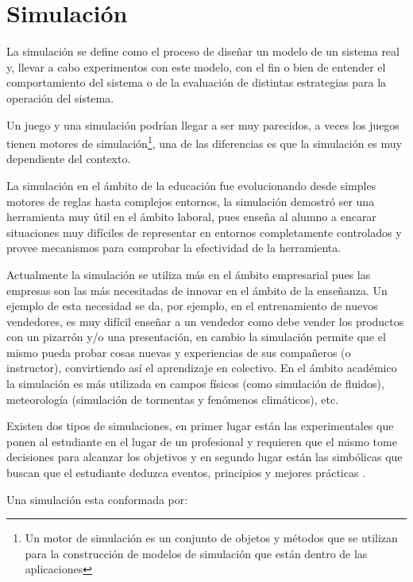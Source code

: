 \section{Simulación}
\label{sec:tics_SIMULACION}

La simulación se define como el proceso de diseñar un modelo de un sistema real
y, llevar a cabo experimentos con este modelo, con el fin o bien de entender el
comportamiento del sistema o de la evaluación de distintas estrategias para la
operación del sistema\cite{ingalls2008introduction}. 

Un juego y una simulación podrían llegar a ser muy parecidos, a veces los juegos
tienen motores de simulación\footnote{Un motor de simulación es un conjunto de
objetos y métodos que se utilizan para la construcción de modelos de
simulación que están dentro de las aplicaciones}, una de las diferencias
es que la simulación es muy dependiente del contexto. 

La simulación en el ámbito de la educación fue evolucionando desde simples
motores de reglas hasta complejos entornos, la simulación demostró ser una
herramienta muy útil en el ámbito laboral\cite{mariluz:seiousgames}, pues enseña
al alumno a encarar situaciones muy difíciles de representar en entornos
completamente controlados y provee mecanismos para comprobar la efectividad de
la herramienta. 

Actualmente la simulación se utiliza más en el ámbito empresarial pues las
empresas son las más necesitadas de innovar en el ámbito de la enseñanza. Un
ejemplo de esta necesidad se da, por ejemplo, en el entrenamiento de nuevos
vendedores, es muy difícil enseñar a un vendedor como debe vender los productos
con un pizarrón y/o una presentación, en cambio la simulación permite que el
mismo pueda probar cosas nuevas y experiencias de sus compañeros (o instructor),
convirtiendo así el aprendizaje en colectivo\cite{mariluz:seiousgames}. En el
ámbito académico la simulación es más utilizada en campos físicos (como simulación
de fluidos), meteorología (simulación de tormentas y fenómenos climáticos), etc. 

Existen dos tipos de simulaciones, en primer lugar están las experimentales que
ponen al estudiante en el lugar de un profesional y requieren que el mismo tome
decisiones para alcanzar los objetivos y en segundo lugar están las simbólicas
que buscan que el estudiante deduzca eventos, principios y mejores prácticas
\cite{charsky:2010}. 

Una simulación esta conformada por:

